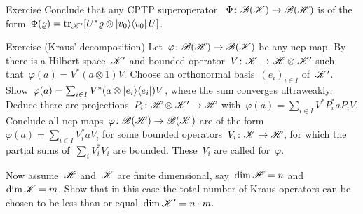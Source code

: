\documentclass[b]{subfiles}
\begin{document}
\begin{parsec}
\begin{point}{Exercise}
    Conclude that any CPTP superoperator ~$
        \Phi \colon \mathscr{B}(\mathscr{K}) \to \mathscr{B}(\mathscr{H})$
        is of the
        form~$\Phi(\varrho) = \mathop{\mathrm{tr}}_{\mathscr{K}'} [U^* \varrho \otimes \left|v_0\right>\!\left<v_0\right| U]$.
\end{point}
\begin{point}{Exercise (Kraus' decomposition)}%
Let~$\varphi \colon \mathscr{B}(\mathscr{H}) \to \mathscr{B}(\mathscr{K})$
    be any ncp-map.
By~
    there is a Hilbert space~$\mathscr{K}'$
    and bounded operator~$V\colon \mathscr{K} \to \mathscr{H} \otimes \mathscr{K}'$
    such that~$\varphi(a) = V^* (a \otimes 1) V$.
Choose an orthonormal basis~$(e_i)_{i \in I}$ of~$\mathscr{K}'$.
Show~$\varphi(a) = \sum_{i \in I} V^* (a \otimes \left|e_i\right>\!\left<e_i\right|) V$,
where the sum converges ultraweakly.
Deduce there are projections~$P_i \colon \mathscr{H} \otimes \mathscr{K}' \to \mathscr{H}$
with~$\varphi(a) = \sum_{i \in I} V^*P_i^* a P_iV$.
Conclude all ncp-maps~$\varphi\colon \mathscr{B}(\mathscr{H}) \to \mathscr{B}(\mathscr{K})$
are of the form~$\varphi(a) = \sum_{i \in I} V_i^* a V_i$
for some bounded operators~$V_i\colon \mathscr{K} \to \mathscr{H}$,
for which the partial sums of~$\sum_i V_i^*V_i$ are bounded.
These~$V_i$ are called  for~$\varphi$.

Now assume~$\mathscr{H}$ and~$\mathscr{K}$ are finite dimensional,
    say~$\dim \mathscr{H} = n$ and~$\dim \mathscr{K} = m$.
Show that in this case
    the total number of Kraus operators can be chosen
    to be less than or equal~$\dim \mathscr{K}' = n \cdot m$.
\end{point}
\end{parsec}
\end{document}
